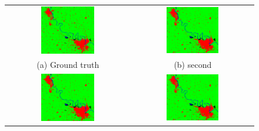 \documentclass[12pt, a4paper]{report}
\begin{document}
\begin{figure}
\begin{center}
\begin{tabular}{cc}
  \includegraphics[width=0.45\textwidth]{train_gt} &   \includegraphics[width=0.45\textwidth]{train_cnn} \\
(a) Ground truth & (b) second \\[6pt]
 \includegraphics[width=0.45\textwidth]{train_cnn} &   \includegraphics[width=0.45\textwidth]{train_cnn} \\

\end{tabular}
\end{center}
\end{figure}
\end{document}

